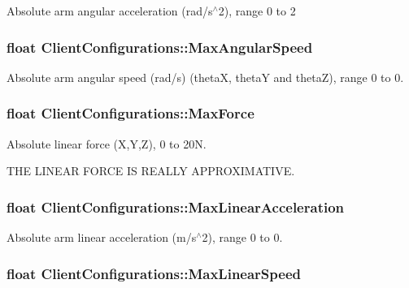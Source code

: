 Absolute arm angular acceleration (rad/s$^\wedge$2), range 0 to 2 \hypertarget{struct_client_configurations_ab7f703d78b05223499d278d9bbb4bebf}{
\subsubsection[{Max\-Angular\-Speed}]{\setlength{\rightskip}{0pt plus 5cm}float Client\-Configurations\-::\-Max\-Angular\-Speed}}\label{struct_client_configurations_ab7f703d78b05223499d278d9bbb4bebf}
Absolute arm angular speed (rad/s) (theta\-X, theta\-Y and theta\-Z), range 0 to 0. \hypertarget{struct_client_configurations_a9c68b6f56291d1be104928f7db071579}{
\subsubsection[{Max\-Force}]{\setlength{\rightskip}{0pt plus 5cm}float Client\-Configurations\-::\-Max\-Force}}\label{struct_client_configurations_a9c68b6f56291d1be104928f7db071579}
\begin{DoxyVerb}  Absolute linear force (X,Y,Z), 0 to 20N. 
\end{DoxyVerb}
 T\-H\-E L\-I\-N\-E\-A\-R F\-O\-R\-C\-E I\-S R\-E\-A\-L\-L\-Y A\-P\-P\-R\-O\-X\-I\-M\-A\-T\-I\-V\-E. \hypertarget{struct_client_configurations_af79f54907501602fb29a7a301ccd2921}{
\subsubsection[{Max\-Linear\-Acceleration}]{\setlength{\rightskip}{0pt plus 5cm}float Client\-Configurations\-::\-Max\-Linear\-Acceleration}}\label{struct_client_configurations_af79f54907501602fb29a7a301ccd2921}
Absolute arm linear acceleration (m/s$^\wedge$2), range 0 to 0. \hypertarget{struct_client_configurations_adbd9eed48ee80ee3ccfdb69872c8de27}{
\subsubsection[{Max\-Linear\-Speed}]{\setlength{\rightskip}{0pt plus 5cm}float Client\-Configurations\-::\-Max\-Linear\-Speed}}\label{struct_client_configurations_adbd9eed48ee80ee3ccfdb69872c8de27}

